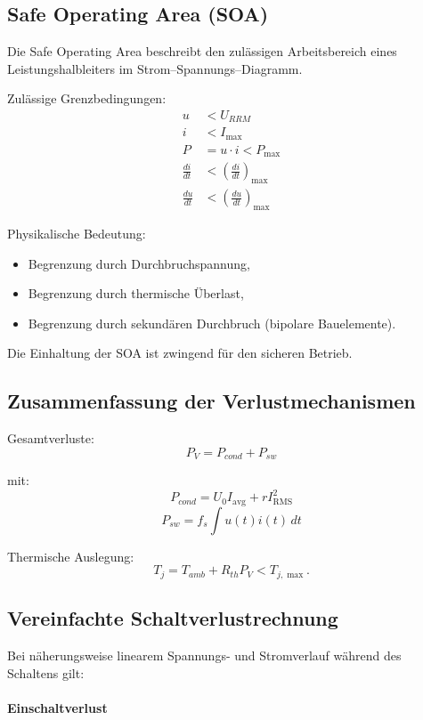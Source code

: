 \subsection{Safe Operating Area (SOA)}

Die Safe Operating Area beschreibt den zulässigen Arbeitsbereich eines Leistungshalbleiters
im Strom–Spannungs–Diagramm.

Zulässige Grenzbedingungen:
\[
\boxed{
\begin{aligned}
u &< U_{RRM} \\
i &< I_{\max} \\
P &= u \cdot i < P_{\max} \\
\frac{di}{dt} &< \left(\frac{di}{dt}\right)_{\max} \\
\frac{du}{dt} &< \left(\frac{du}{dt}\right)_{\max}
\end{aligned}
}
\]

Physikalische Bedeutung:
\begin{itemize}
\item Begrenzung durch Durchbruchspannung,
\item Begrenzung durch thermische Überlast,
\item Begrenzung durch sekundären Durchbruch (bipolare Bauelemente).
\end{itemize}

Die Einhaltung der SOA ist zwingend für den sicheren Betrieb.


\subsection{Zusammenfassung der Verlustmechanismen}

Gesamtverluste:
\[
\boxed{P_V = P_{cond} + P_{sw}}
\]

mit:
\[
P_{cond} = U_0 I_{\mathrm{avg}} + r I_{\mathrm{RMS}}^2
\]
\[
P_{sw} = f_s \int u(t)i(t)\,dt
\]

Thermische Auslegung:
\[
T_j = T_{amb} + R_{th} P_V < T_{j,\max}.
\]
\subsection{Vereinfachte Schaltverlustrechnung}

Bei näherungsweise linearem Spannungs- und Stromverlauf während des Schaltens gilt:

\paragraph{Einschaltverlust}

